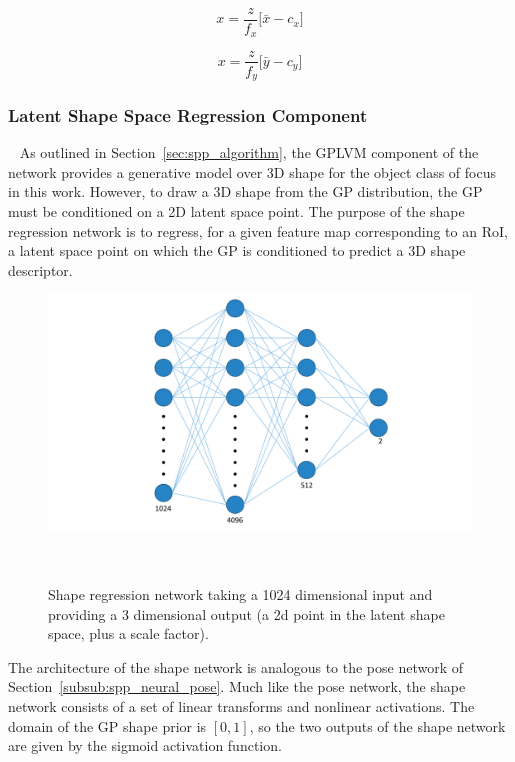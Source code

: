 \begin{equation}
  \label{eqn:spp_x_3d}
  x = \frac{z}{f_{x}} \Big[ \bar{x} - c_{x} \Big]
\end{equation}

\begin{equation}
  \label{eqn:spp_y_3d}
  x = \frac{z}{f_{y}} \Big[ \bar{y} - c_{y} \Big]
\end{equation}

\subsubsection{Latent Shape Space Regression Component}
~\label{subsub:spp_neural_latent}
As outlined in Section~\ref{sec:spp_algorithm}, the GPLVM component of the network provides 
a generative model over 3D shape for the object class of focus in this work. However, to draw 
a 3D shape from the GP distribution, the GP must be conditioned on a 2D latent space 
point. The purpose of the shape regression network is to regress, for a given feature map corresponding 
to an RoI, a latent space point on which the GP is conditioned to predict a 3D shape descriptor.

\begin{figure}[!htbp]
  \centering
  \includegraphics[width=.8\linewidth]{figures/spp/shape_net_diagram.pdf}
  \caption[Shape Regression Network]{Shape regression network taking a 1024 dimensional 
  input and providing a 3 dimensional output (a 2d point in the latent shape space, plus a scale factor).}
~\label{figure:spp_shape_block}
\end{figure}

The architecture of the shape network is analogous to the pose network of Section~\ref{subsub:spp_neural_pose}. 
Much like the pose network, the shape network consists of a set of linear transforms and nonlinear 
activations. The domain of the GP shape prior is \( [0, 1] \), so the two outputs of the shape network 
are given by the sigmoid activation function.

